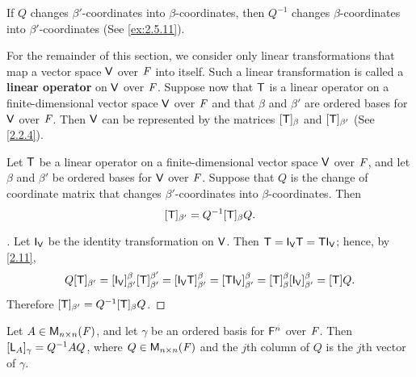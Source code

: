 \begin{note}
	If \(Q\) changes \(\beta'\)-coordinates into \(\beta\)-coordinates, then \(Q^{-1}\) changes \(\beta\)-coordinates into \(\beta'\)-coordinates
	(See \cref{ex:2.5.11}).
\end{note}

\begin{defn}\label{2.5.2}
	For the remainder of this section, we consider only linear transformations that map a vector space \(\mathsf{V}\) over \(\mathit{F}\) into itself.
	Such a linear transformation is called a \textbf{linear operator} on \(\mathsf{V}\) over \(\mathit{F}\).
	Suppose now that \(\mathsf{T}\) is a linear operator on a finite-dimensional vector space \(\mathsf{V}\) over \(\mathit{F}\) and that \(\beta\) and \(\beta'\) are ordered bases for \(\mathsf{V}\) over \(\mathit{F}\).
	Then \(\mathsf{V}\) can be represented by the matrices \([\mathsf{T}]_{\beta}\) and \([\mathsf{T}]_{\beta'}\)
	(See \cref{2.2.4}).
\end{defn}

\begin{thm}\label{2.23}
	Let \(\mathsf{T}\) be a linear operator on a finite-dimensional vector space \(\mathsf{V}\) over \(\mathit{F}\), and let \(\beta\) and \(\beta'\) be ordered bases for \(\mathsf{V}\) over \(\mathit{F}\).
	Suppose that \(Q\) is the change of coordinate matrix that changes \(\beta'\)-coordinates into \(\beta\)-coordinates.
	Then
	\[
		[\mathsf{T}]_{\beta'} = Q^{-1} [\mathsf{T}]_{\beta} Q.
	\]
\end{thm}

\begin{proof}[]
	Let \(\IT[\V]\) be the identity transformation on \(\mathsf{V}\).
	Then \(\T = \IT[\V] \T = \T \IT[\V]\);
	hence, by \cref{2.11},
	\[
		Q [\T]_{\beta'} = [\IT[\V]]_{\beta'}^{\beta} [\T]_{\beta'}^{\beta'} = [\IT[\V] \T]_{\beta'}^{\beta} = [\T \IT[\V]]_{\beta'}^{\beta} = [\T]_{\beta}^{\beta} [\IT[\V]]_{\beta'}^{\beta} = [\T] Q.
	\]
	Therefore \([\mathsf{T}]_{\beta'} = Q^{-1} [\mathsf{T}]_{\beta} Q\).
\end{proof}

\begin{cor}\label{2.5.3}
	Let \(A \in \ms[n][n][\F]\), and let \(\gamma\) be an ordered basis for \(\mathsf{F}^n\) over \(\mathit{F}\).
	Then \([\mathsf{L}_A]_{\gamma} = Q^{-1} A Q\), where \(Q \in \ms[n][n][\F]\) and the \(j\)th column of \(Q\) is the \(j\)th vector of \(\gamma\).
\end{cor}

